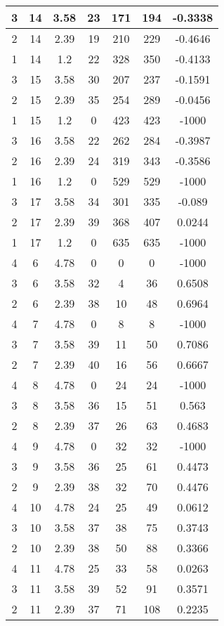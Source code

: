 \documentclass[letterpaper, 12pt]{article}
\begin{document}
\begin{longtable}{|c|c|c|c|c|c|c|}
\hline
3 & 14 & 3.58 & 23 & 171 & 194 & -0.3338 \\
\hline
2 & 14 & 2.39 & 19 & 210 & 229 & -0.4646 \\
\hline
1 & 14 & 1.2 & 22 & 328 & 350 & -0.4133 \\
\hline
3 & 15 & 3.58 & 30 & 207 & 237 & -0.1591 \\
\hline
2 & 15 & 2.39 & 35 & 254 & 289 & -0.0456 \\
\hline
1 & 15 & 1.2 & 0 & 423 & 423 & -1000 \\
\hline
3 & 16 & 3.58 & 22 & 262 & 284 & -0.3987 \\
\hline
2 & 16 & 2.39 & 24 & 319 & 343 & -0.3586 \\
\hline
1 & 16 & 1.2 & 0 & 529 & 529 & -1000 \\
\hline
3 & 17 & 3.58 & 34 & 301 & 335 & -0.089 \\
\hline
2 & 17 & 2.39 & 39 & 368 & 407 & 0.0244 \\
\hline
1 & 17 & 1.2 & 0 & 635 & 635 & -1000 \\
\hline
4 & 6 & 4.78 & 0 & 0 & 0 & -1000 \\
\hline
3 & 6 & 3.58 & 32 & 4 & 36 & 0.6508 \\
\hline
2 & 6 & 2.39 & 38 & 10 & 48 & 0.6964 \\
\hline
4 & 7 & 4.78 & 0 & 8 & 8 & -1000 \\
\hline
3 & 7 & 3.58 & 39 & 11 & 50 & 0.7086 \\
\hline
2 & 7 & 2.39 & 40 & 16 & 56 & 0.6667 \\
\hline
4 & 8 & 4.78 & 0 & 24 & 24 & -1000 \\
\hline
3 & 8 & 3.58 & 36 & 15 & 51 & 0.563 \\
\hline
2 & 8 & 2.39 & 37 & 26 & 63 & 0.4683 \\
\hline
4 & 9 & 4.78 & 0 & 32 & 32 & -1000 \\
\hline
3 & 9 & 3.58 & 36 & 25 & 61 & 0.4473 \\
\hline
2 & 9 & 2.39 & 38 & 32 & 70 & 0.4476 \\
\hline
4 & 10 & 4.78 & 24 & 25 & 49 & 0.0612 \\
\hline
3 & 10 & 3.58 & 37 & 38 & 75 & 0.3743 \\
\hline
2 & 10 & 2.39 & 38 & 50 & 88 & 0.3366 \\
\hline
4 & 11 & 4.78 & 25 & 33 & 58 & 0.0263 \\
\hline
3 & 11 & 3.58 & 39 & 52 & 91 & 0.3571 \\
\hline
2 & 11 & 2.39 & 37 & 71 & 108 & 0.2235 \\

\end{longtable}
\end{document}

